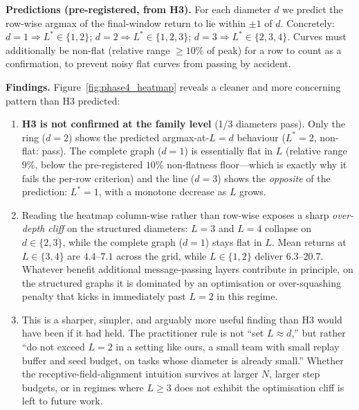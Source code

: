 \textbf{Predictions (pre-registered, from H3).}
For each diameter $d$ we predict the row-wise argmax of the
final-window return to lie within $\pm 1$ of $d$. Concretely:
$d=1 \Rightarrow L^* \in \{1, 2\}$; $d=2 \Rightarrow L^* \in \{1, 2, 3\}$;
$d=3 \Rightarrow L^* \in \{2, 3, 4\}$. Curves must additionally be non-flat
(relative range $\ge 10\%$ of peak) for a row to count as a confirmation,
to prevent noisy flat curves from passing by accident.



\textbf{Findings.} Figure~\ref{fig:phase4_heatmap} reveals a cleaner and more concerning pattern than H3 predicted:

\begin{enumerate}[leftmargin=*,itemsep=0pt,topsep=2pt]
  \item \textbf{H3 is not confirmed at the family level} (1/3 diameters
        pass). Only the ring ($d=2$) shows the predicted argmax-at-$L=d$
        behaviour ($L^*=2$, non-flat: pass). The complete graph
        ($d=1$) is essentially flat in $L$ (relative range $9\%$, below the
        pre-registered $10\%$ non-flatness floor---which is exactly why it
        fails the per-row criterion) and the line ($d=3$) shows the
        \emph{opposite} of the prediction: $L^*=1$, with a monotone
        decrease as $L$ grows.
  \item Reading the heatmap column-wise rather than row-wise exposes a
        sharp \emph{over-depth cliff} on the structured diameters: $L=3$
        and $L=4$ collapse on $d \in \{2, 3\}$, while the complete graph
        ($d=1$) stays flat in $L$. Mean returns at $L \in \{3, 4\}$ are
        $4.4$--$7.1$ across the grid, while $L \in \{1, 2\}$ deliver
        $6.3$--$20.7$. Whatever benefit additional message-passing layers
        contribute in principle, on the structured graphs it is dominated
        by an optimisation or
        over-squashing penalty that kicks in immediately past $L=2$ in
        this regime.
  \item This is a sharper, simpler, and arguably more useful finding
        than H3 would have been if it had held. The practitioner rule
        is not ``set $L \approx d$,'' but rather ``do not exceed
        $L = 2$ in a setting like ours, a small team with small
        replay buffer and seed budget, on tasks whose diameter is
        already small.'' Whether the receptive-field-alignment intuition
        survives at larger $N$, larger step budgets, or in regimes where
        $L \ge 3$ does not exhibit the optimisation cliff is left to
        future work.
\end{enumerate}

